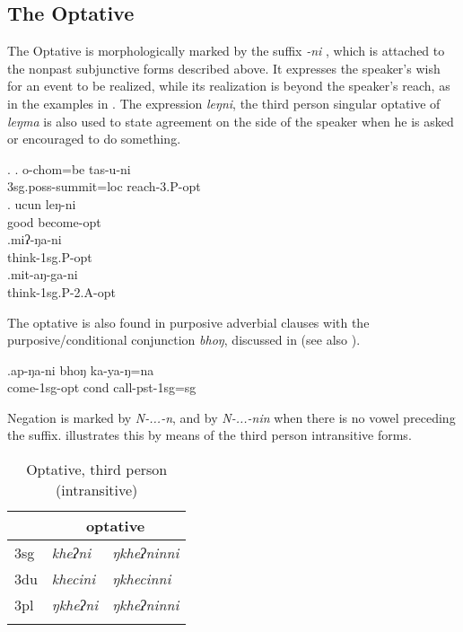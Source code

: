  
	
\subsection{The Optative}

The Optative is morphologically marked by the suffix \emph{-ni} , which is attached to  the nonpast subjunctive forms described above. It expresses the speaker's wish for an event  to be realized, while its realization is beyond the speaker's reach, as in the examples in \Next. The expression \emph{leŋni}, the third person singular optative of \emph{leŋma}  is also used to state agreement on the side of the speaker when he is asked or encouraged to do something.
 
\ex. \ag. o-chom=be tas-u-ni\\
		{\sc 3sg.poss-}summit{\sc =loc} reach{\sc -3.P-opt}	\\
	 \bg. ucun leŋ-ni\\ 
		good become{\sc [3sg]-opt}	\\
	 \bg.miʔ-ŋa-ni\\
  think{\sc -1sg.P-opt}\\
   \bg.mit-aŋ-ga-ni\\
  think{\sc -1sg.P-2.A-opt}\\
  
The optative is also found in purposive adverbial clauses with the purposive/conditional conjunction \emph{bhoŋ}, discussed in  (see also \Next). 

\exg.ap-ŋa-ni bhoŋ ka-ya-ŋ=na\\
come{\sc -1sg-opt} {\sc cond} call{\sc -pst-1sg=sg}\\

Negation is marked by \emph{N-...-n}, and by \emph{N-...-nin} when there is no vowel preceding the suffix.  illustrates this by means of the third person intransitive forms.

\begin{table}[htp]
\begin{center}
\begin{tabular}{lll}
\lsptoprule
&\multicolumn{2}{c}{{\sc optative}}\\
\midrule
		{\sc 3sg} & \it kheʔni& \it ŋkheʔninni\\
 		{\sc 3du} & \it khecini& \it ŋkhecinni\\
		{\sc 3pl} & \it ŋkheʔni& \it ŋkheʔninni\\
\lspbottomrule	
\end{tabular}
\end{center}
\caption{Optative, third person (intransitive)}\label{par-opt-intr}
\end{table}



